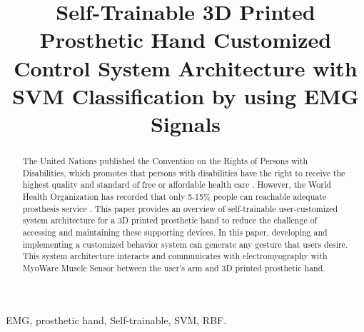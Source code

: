 \documentclass[conference]{IEEEtran}
\begin{document}
\title{Self-Trainable 3D Printed Prosthetic Hand Customized Control System Architecture with SVM Classification by using EMG Signals}

\author{
\and
{}
}


\maketitle

\begin{abstract}
The United Nations published the Convention on the Rights of Persons with Disabilities, which promotes that persons with disabilities have the right to receive the highest quality and standard of free or affordable health care \cite{UN}. However, the World Health Organization has recorded that only 5-15\% people can reachable adequate prosthesis service \cite{WHO}. This paper provides an overview of self-trainable user-customized system architecture for a 3D printed prosthetic hand to reduce the challenge of accessing and maintaining these supporting devices. In this paper, developing and implementing a customized behavior system can generate any gesture that users desire. This system architecture interacts and communicates with electromyography with MyoWare Muscle Sensor between the user's arm and 3D printed prosthetic hand.
\end{abstract}

\begin{IEEEkeywords}
EMG, prosthetic hand, Self-trainable, SVM, RBF.
\end{IEEEkeywords}


\IEEEpeerreviewmaketitle


\end{document}
